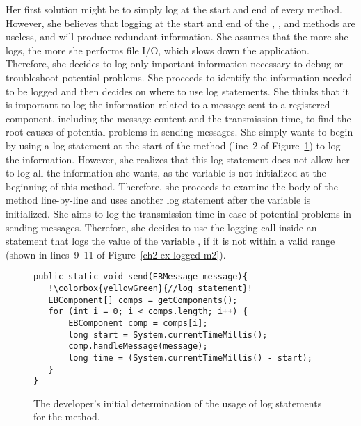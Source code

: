 Her first solution might be to simply log at the start and end of every method. However, she believes that logging at the start and end of the , \-\-, and  methods are useless, and will produce redundant information. She assumes that the more she logs, the more she performs file I/O, which slows down the application. Therefore, she decides to log only important information necessary to debug or troubleshoot potential problems. She proceeds to identify the information needed to be logged and then decides on where to use log statements. She thinks that it is important to log the information related to a message sent to a registered component, including the message content and the transmission time, to find the root causes of potential problems in sending messages. She simply wants to begin by using a log statement at the start of the  method (line~2 of Figure~\ref{ch2-ex-logged-m1}) to log the information. However, she realizes that this log statement does not allow her to log all the information she wants, as the  variable is not initialized at the beginning of this method. Therefore, she proceeds to examine the body of the  method line-by-line and uses another log statement after the  variable is initialized. She aims to log the transmission time in case of potential problems in sending messages. Therefore, she decides to use the logging call inside an  statement that logs the value of the variable , if it is not within a valid range (shown in lines~9--11 of Figure~\ref{ch2-ex-logged-m2}).

\begin{figure}[p]
\def\baselinestretch{1}
\begin{lstlisting}[escapechar=!]
public static void send(EBMessage message){
   !\colorbox{yellowGreen}{//log statement}!
   EBComponent[] comps = getComponents();
   for (int i = 0; i < comps.length; i++) {
       EBComponent comp = comps[i];
       long start = System.currentTimeMillis();
       comp.handleMessage(message);
       long time = (System.currentTimeMillis() - start);
   }
}
\end{lstlisting}
\caption[The developer's initial determination of the usage of logging calls.]{The developer's initial determination of the usage of log statements for the  method.\label{ch2-ex-logged-m1}}
\end{figure}


